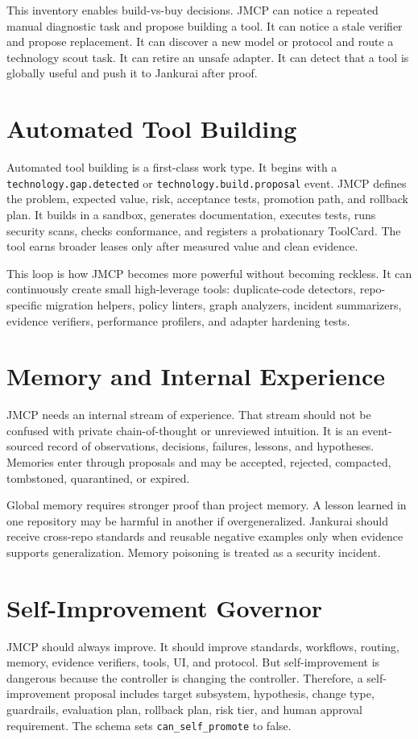 \documentclass[10pt,journal,onecolumn]{IEEEtran}
\begin{document}
This inventory enables build-vs-buy decisions. JMCP can notice a repeated manual diagnostic task and propose building a tool. It can notice a stale verifier and propose replacement. It can discover a new model or protocol and route a technology scout task. It can retire an unsafe adapter. It can detect that a tool is globally useful and push it to Jankurai after proof.

\section{Automated Tool Building}
Automated tool building is a first-class work type. It begins with a \texttt{technology.gap.detected} or \texttt{technology.build.proposal} event. JMCP defines the problem, expected value, risk, acceptance tests, promotion path, and rollback plan. It builds in a sandbox, generates documentation, executes tests, runs security scans, checks conformance, and registers a probationary ToolCard. The tool earns broader leases only after measured value and clean evidence.

This loop is how JMCP becomes more powerful without becoming reckless. It can continuously create small high-leverage tools: duplicate-code detectors, repo-specific migration helpers, policy linters, graph analyzers, incident summarizers, evidence verifiers, performance profilers, and adapter hardening tests.

\section{Memory and Internal Experience}
JMCP needs an internal stream of experience. That stream should not be confused with private chain-of-thought or unreviewed intuition. It is an event-sourced record of observations, decisions, failures, lessons, and hypotheses. Memories enter through proposals and may be accepted, rejected, compacted, tombstoned, quarantined, or expired.

Global memory requires stronger proof than project memory. A lesson learned in one repository may be harmful in another if overgeneralized. Jankurai should receive cross-repo standards and reusable negative examples only when evidence supports generalization. Memory poisoning is treated as a security incident.

\section{Self-Improvement Governor}
JMCP should always improve. It should improve standards, workflows, routing, memory, evidence verifiers, tools, UI, and protocol. But self-improvement is dangerous because the controller is changing the controller. Therefore, a self-improvement proposal includes target subsystem, hypothesis, change type, guardrails, evaluation plan, rollback plan, risk tier, and human approval requirement. The schema sets \texttt{can\_self\_promote} to false.
\end{document}
